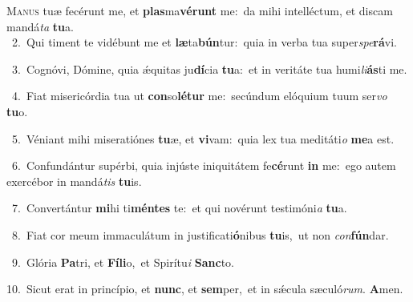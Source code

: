 \lettrine{\initial\textcolor{\initialcolor}{M}}{anus} tuæ fecérunt me, et \textbf{plas}\-ma\-\textbf{vé}\-\textbf{runt} me:~\star da mihi intelléctum, et discam mandá\textit{ta} \textbf{tu}\-a.\\
{\numbfont\textcolor{\numbcolor}{~2.}}~Qui timent te vidébunt me et \textbf{læ}\-ta\-\textbf{bún}\-tur:~\star quia in verba tua super\-\textit{spe}\-\textbf{rá}vi.\par
{\numbfont\textcolor{\numbcolor}{~3.}}~Cognóvi, Dómine, quia ǽquitas ju\-\textbf{dí}\-cia \textbf{tu}\-a:~\star et in veritáte tua humi\-\textit{li}\-\textbf{ás}ti me.\par
{\numbfont\textcolor{\numbcolor}{~4.}}~Fiat misericórdia tua ut \textbf{con}\-so\-\textbf{lé}\-\textbf{tur} me:~\star secúndum elóquium tuum ser\textit{vo} \textbf{tu}\-o.\par
{\numbfont\textcolor{\numbcolor}{~5.}}~Véniant mihi miseratiónes \textbf{tu}\-æ, et \textbf{vi}\-vam:~\star quia lex tua meditáti\textit{o} \textbf{me}\-a est.\par
{\numbfont\textcolor{\numbcolor}{~6.}}~Confundántur supérbi, quia injúste iniquitátem fe\-\textbf{cé}\-runt \textbf{in} me:~\star ego autem exercébor in mandá\textit{tis} \textbf{tu}\-is.\par
{\numbfont\textcolor{\numbcolor}{~7.}}~Convertántur \textbf{mi}\-hi ti\-\textbf{mén}\-\textbf{tes} te:~\star et qui novérunt testimóni\textit{a} \textbf{tu}\-a.\par
{\numbfont\textcolor{\numbcolor}{~8.}}~Fiat cor meum immaculátum in justificati\-\textbf{ó}\-nibus \textbf{tu}\-is,~\star ut non \textit{con}\-\textbf{fún}dar.\par
{\numbfont\textcolor{\numbcolor}{~9.}}~Glória \textbf{Pa}\-tri, et \textbf{Fí}\-\textbf{li}o,~\star et Spirítu\textit{i} \textbf{Sanc}\-to.\par
{\numbfont\textcolor{\numbcolor}{10.}}~Sicut erat in princípio, et \textbf{nunc}\-, et \textbf{sem}\-per,~\star et in sǽcula sæculó\-\textit{rum}\-. \textbf{A}\-men.\par

